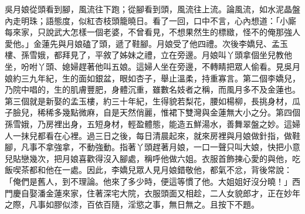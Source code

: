 \begin{showcontents}{}
吳月娘從頭看到腳，風流往下跑；從腳看到頭，風流往上流。論風流，如水泥晶盤內走明珠；語態度，似紅杏枝頭籠曉日。看了一回，口中不言，心內想道：「小廝每來家，只說武大怎樣一個老婆，不曾看見，不想果然生的標緻，怪不的俺那強人愛他。」金蓮先與月娘磕了頭，遞了鞋腳。月娘受了他四禮。次後李嬌兒、孟玉樓、孫雪娥，都拜見了，平敘了姊妹之禮，立在旁邊。月娘叫丫頭拿個坐兒教他坐，吩咐丫頭、媳婦趕著他叫五娘。這婦人坐在旁邊，不轉睛把眾人偷看。見吳月娘約三九年紀，生的面如銀盆，眼如杏子，舉止溫柔，持重寡言。第二個李嬌兒，乃院中唱的，生的肌膚豐肥，身體沉重，雖數名妓者之稱，而風月多不及金蓮也。第三個就是新娶的孟玉樓，約三十年紀，生得貌若梨花，腰如楊柳，長挑身材，瓜子臉兒，稀稀多幾點微麻，自是天然俏麗，惟裙下雙灣與金蓮無大小之分。第四個孫雪娥，乃房裡出身，五短身材，輕盈體態，能造五鮮湯水，善舞翠盤之妙。這婦人一抹兒都看在心裡。過三日之後，每日清晨起來，就來房裡與月娘做針指，做鞋腳，凡事不拿強拿，不動強動。指著丫頭趕著月娘，一口一聲只叫大娘，快把小意兒貼戀幾次，把月娘喜歡得沒入腳處，稱呼他做六姐。衣服首飾揀心愛的與他，吃飯喫茶都和他在一處。因此，李嬌兒眾人見月娘錯敬他，都氣不忿，背後常說：「俺們是舊人，到不理論。他來了多少時，便這等慣了他。大姐姐好沒分曉！」西門慶自娶潘金蓮來家，住著深宅大院，衣服頭面又相趁，二人女貌郎才，正在妙年之際，凡事如膠似漆，百依百隨，淫慾之事，無日無之。且按下不題。


\end{showcontents}
